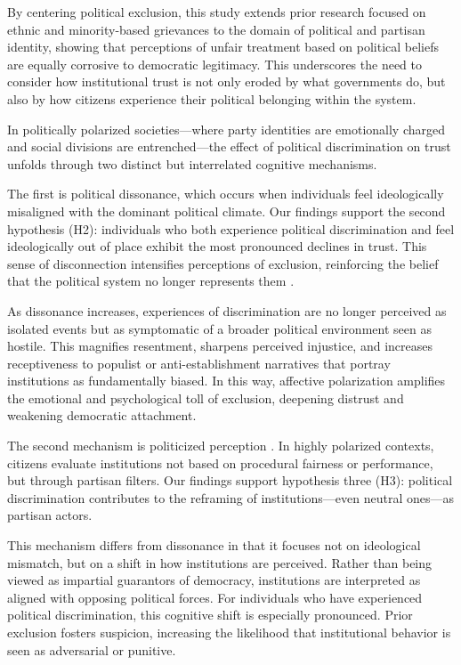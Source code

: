 \documentclass{article}
\begin{document}
By centering political exclusion, this study extends prior research focused on ethnic and minority-based grievances \parencite{wilkes_immigration_2019, tyrberg_impact_2024} to the domain of political and partisan identity, showing that  perceptions of unfair treatment based on political beliefs are equally corrosive to democratic legitimacy. This underscores the need to consider how institutional trust is not only eroded by what governments do, but also by how citizens experience their political belonging within the system.

In politically polarized societies—where party identities are emotionally charged and social divisions are entrenched—the effect of political discrimination on trust unfolds through two distinct but interrelated cognitive mechanisms.

The first is political dissonance, which occurs when individuals feel ideologically misaligned with the dominant political climate. Our findings support the second hypothesis (H2): individuals who both experience political discrimination and feel ideologically out of place exhibit the most pronounced declines in trust. This sense of disconnection intensifies perceptions of exclusion, reinforcing the belief that the political system no longer represents them \parencite{mccoy_polarization_2018, iyengar_fear_2015}.

As dissonance increases, experiences of discrimination are no longer perceived as isolated events but as symptomatic of a broader political environment seen as hostile. This magnifies resentment, sharpens perceived injustice, and increases receptiveness to populist or anti-establishment narratives that portray institutions as fundamentally biased. In this way, affective polarization amplifies the emotional and psychological toll of exclusion, deepening distrust and weakening democratic attachment.

The second mechanism is politicized perception \parencite{rogowski_how_2016, druckman_what_2019}. In highly polarized contexts, citizens evaluate institutions not based on procedural fairness or performance, but through partisan filters. Our findings support hypothesis three (H3): political discrimination contributes to the reframing of institutions—even neutral ones—as partisan actors.

This mechanism differs from dissonance in that it focuses not on ideological mismatch, but on a shift in how institutions are perceived. Rather than being viewed as impartial guarantors of democracy, institutions are interpreted as aligned with opposing political forces. For individuals who have experienced political discrimination, this cognitive shift is especially pronounced. Prior exclusion fosters suspicion, increasing the likelihood that institutional behavior is seen as adversarial or punitive.
\end{document}
